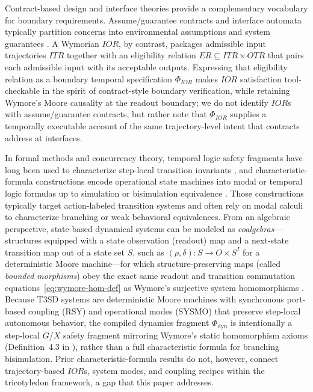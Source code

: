 Contract-based design and interface theories provide a complementary vocabulary for boundary requirements. Assume/guarantee contracts and interface automata typically partition concerns into environmental assumptions and system guarantees \citep{BenvenisteEtAl2018,deAlfaroHenzinger2001}. A Wymorian $IOR$, by contrast, packages admissible input trajectories $ITR$ together with an eligibility relation $ER\subseteq ITR\times OTR$ that pairs each admissible input with its acceptable outputs. Expressing that eligibility relation as a boundary temporal specification $\Phi_{IOR}$ makes $IOR$ satisfaction tool-checkable in the spirit of contract-style boundary verification, while retaining Wymore's Moore causality at the readout boundary; we do not identify $IOR$s with assume/guarantee contracts, but rather note that $\Phi_{IOR}$ supplies a temporally executable account of the same trajectory-level intent that contracts address at interfaces.

In formal methods and concurrency theory, temporal logic safety fragments have long been used to characterize step-local transition invariants \citep{Sistla1994,MannaPnueli1995}, and characteristic-formula constructions encode operational state machines into modal or temporal logic formulas up to simulation or bisimulation equivalence \citep{Milner1989,GrafSifakis1986,SteffenIngolfsdottir1994,AcetoEtAl2012}. Those constructions typically target action-labeled transition systems and often rely on modal calculi to characterize branching or weak behavioral equivalences. From an algebraic perspective, state-based dynamical systems can be modeled as \emph{coalgebras}---structures equipped with a state observation (readout) map and a next-state transition map out of a state set $S$, such as $(\rho,\delta):S\to O\times S^I$ for a deterministic Moore machine---for which structure-preserving maps (called \emph{bounded morphisms}) obey the exact same readout and transition commutation equations~\eqref{eq:wymore-hom-def} as Wymore's surjective system homomorphisms \citep{Rutten2000,BlackburnDeRijkeVenema2001}. Because T3SD systems are deterministic Moore machines with synchronous port-based coupling ($\mathrm{RSY}$) and operational modes ($\mathrm{SYSMO}$) that preserve step-local autonomous behavior, the compiled dynamics fragment $\Phi_{\mathrm{dyn}}$ is intentionally a step-local $G$/$X$ safety fragment mirroring Wymore's static homomorphism axioms (Definition~4.3 in \citet{Wymore1993}), rather than a full characteristic formula for branching bisimulation. Prior characteristic-formula results do not, however, connect trajectory-based $IOR$s, system modes, and coupling recipes within the tricotyledon framework, a gap that this paper addresses.


